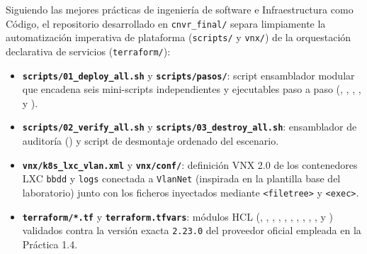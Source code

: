 Siguiendo las mejores prácticas de ingeniería de software e Infraestructura como Código, el repositorio desarrollado en \texttt{cnvr\_final/} separa limpiamente la automatización imperativa de plataforma (\texttt{scripts/} y \texttt{vnx/}) de la orquestación declarativa de servicios (\texttt{terraform/}):

\begin{itemize}
  \item \textbf{\texttt{scripts/01\_deploy\_all.sh}} y \textbf{\texttt{scripts/pasos/}}: script ensamblador modular que encadena seis mini-scripts independientes y ejecutables paso a paso (, , , ,  y ).
  \item \textbf{\texttt{scripts/02\_verify\_all.sh}} y \textbf{\texttt{scripts/03\_destroy\_all.sh}}: ensamblador de auditoría () y script de desmontaje ordenado del escenario.
  \item \textbf{\texttt{vnx/k8s\_lxc\_vlan.xml}} y \textbf{\texttt{vnx/conf/}}: definición VNX 2.0 de los contenedores LXC \texttt{bbdd} y \texttt{logs} conectada a \texttt{VlanNet} (inspirada en la plantilla base  del laboratorio) junto con los ficheros inyectados mediante \texttt{<filetree>} y \texttt{<exec>}.
  \item \textbf{\texttt{terraform/*.tf}} y \textbf{\texttt{terraform.tfvars}}: módulos HCL (, , , , , , , , , ,  y ) validados contra la versión exacta \texttt{2.23.0} del proveedor oficial  empleada en la Práctica 1.4.
\end{itemize}
